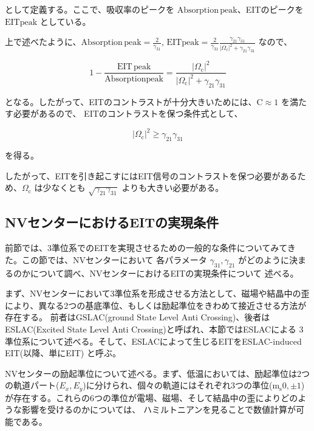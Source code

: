 \documentclass[11pt,a4paper]{ltjsarticle}
\begin{document}
として定義する。ここで、吸収率のピークを $\mathrm{Absorption \, peak}$、EITのピークを $\mathrm{EIT peak}$ としている。

上で述べたように、$\mathrm{Absorption \, peak} = \frac{2}{\gamma_{31}}$, $\mathrm{EIT peak} = \frac{2}{\gamma_{31}} \frac{\gamma_{21} \gamma_{31}}{ { |\Omega_{\mathrm{c}}| }^2 + \gamma_{21} \gamma_{31} }$
なので、

\begin{equation*}
  1 - \frac{\mathrm{EIT \, peak}}{\mathrm{Absorption peak}} = \frac{ {|\Omega_{\mathrm{c}}|}^2  }{ {|\Omega_{\mathrm{c}}|}^2 + \gamma_{21} \gamma_{31} }
\end{equation*}

となる。したがって、EITのコントラストが十分大きいためには、$\mathrm{C} \approx 1$ を満たす必要があるので、
EITのコントラストを保つ条件式として、

\begin{equation}
\label{condition on contrast}
  { |\Omega_{\mathrm{c}}| }^2 \geqslant  \gamma_{21} \gamma_{31}
\end{equation}

を得る。
 

したがって、EITを引き起こすにはEIT信号のコントラストを保つ必要があるため、$\Omega_{\mathrm{c}}$ は少なくとも $\sqrt{ \gamma_{21} \gamma_{31} }$
よりも大きい必要がある。

\subsection{NVセンターにおけるEITの実現条件}

前節では、3準位系でのEITを実現させるための一般的な条件についてみてきた。この節では、NVセンターにおいて
各パラメータ $\gamma_{31}, \gamma_{21}$ がどのように決まるのかについて調べ、NVセンターにおけるEITの実現条件について
述べる。

まず、NVセンターにおいて3準位系を形成させる方法として、磁場や結晶中の歪により、異なる2つの基底準位、もしくは励起準位をきわめて接近させる方法が存在する。
前者はGSLAC(ground State Level Anti Crossing)、後者はESLAC(Excited State Level Anti Crossing)と呼ばれ、本節ではESLACによる
3準位系について述べる。そして、ESLACによって生じるEITをESLAC-induced EIT(以降、単にEIT) と呼ぶ。

NVセンターの励起準位について述べる。まず、低温においては、励起準位は2つの軌道パート($E_{x}, E_{y}$)に分けられ、個々の軌道にはそれぞれ3つの準位($ \mathrm{m_{\mathrm{s}}} 0, \pm1$)
が存在する。これらの6つの準位が電場、磁場、そして結晶中の歪によりどのような影響を受けるのかについては、
ハミルトニアンを見ることで数値計算が可能である。
\end{document}
